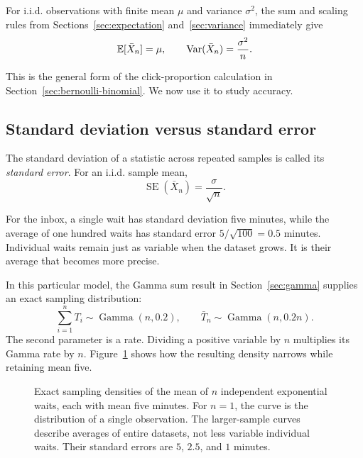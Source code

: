 \begin{result}
For i.i.d. observations with finite mean \(\mu\) and variance
\(\sigma^2\), the sum and scaling rules from
Sections~\ref{sec:expectation} and~\ref{sec:variance} immediately give
\begin{equation}
  \mathbb{E}[\bar X_n]=\mu,\qquad
  \operatorname{Var}(\bar X_n)=\frac{\sigma^2}{n}.
  \label{eq:sample-mean-moments}
\end{equation}
\end{result}
This is the general form of the click-proportion calculation in
Section~\ref{sec:bernoulli-binomial}. We now use it to study accuracy.

\subsection{Standard deviation versus standard error}

\begin{definition}
The standard deviation of a statistic across repeated samples is
called its \emph{standard error}. For an i.i.d. sample mean,
\begin{equation}
  \operatorname{SE}(\bar X_n)=\frac{\sigma}{\sqrt n}.
  \label{eq:standard-error}
\end{equation}
\end{definition}
For the inbox, a single wait has standard deviation five minutes,
while the average of one hundred waits has standard error
\(5/\sqrt{100}=0.5\) minutes. Individual waits remain just as variable
when the dataset grows. It is their average that becomes more precise.

In this particular model, the Gamma sum result in
Section~\ref{sec:gamma} supplies an exact sampling distribution:
\begin{equation}
  \sum_{i=1}^n T_i\sim\operatorname{Gamma}(n,0.2),\qquad
  \bar T_n\sim\operatorname{Gamma}(n,0.2n).
  \label{eq:exponential-sample-mean}
\end{equation}
The second parameter is a rate. Dividing a positive variable by \(n\)
multiplies its Gamma rate by \(n\). Figure~\ref{fig:ch4-sampling}
shows how the resulting density narrows while retaining mean five.

\begin{figure}[H]
  \centering
  
  \caption{Exact sampling densities of the mean of \(n\) independent
  exponential waits, each with mean five minutes. For \(n=1\), the
  curve is the distribution of a single observation. The larger-sample
  curves describe averages of entire datasets, not less variable
  individual waits. Their standard errors are \(5\), \(2.5\), and
  \(1\) minutes.}
  \label{fig:ch4-sampling}
\end{figure}

